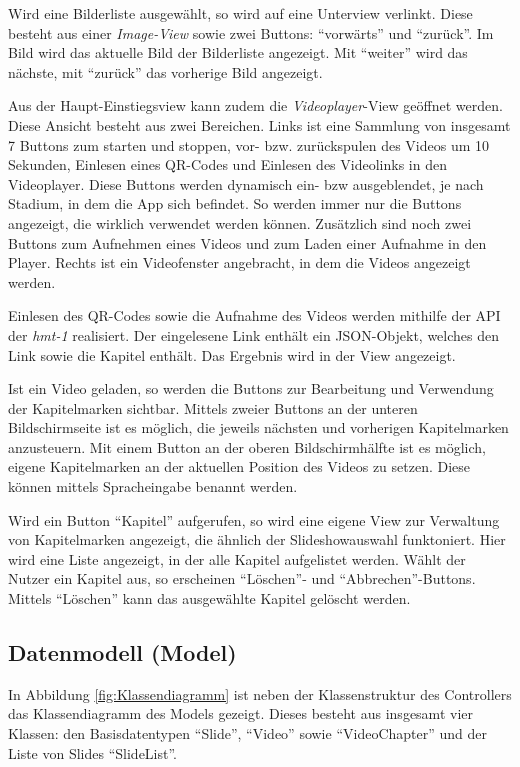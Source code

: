Wird eine Bilderliste ausgewählt, so wird auf eine Unterview verlinkt. Diese besteht aus einer \emph{Image-View} sowie zwei Buttons: \enquote{vorwärts} und \enquote{zurück}. Im Bild wird das aktuelle Bild der Bilderliste angezeigt. Mit \enquote{weiter} wird das nächste, mit \enquote{zurück} das vorherige Bild angezeigt.

Aus der Haupt-Einstiegsview kann zudem die \emph{Videoplayer}-View geöffnet werden. Diese Ansicht besteht aus zwei Bereichen. Links ist eine Sammlung von insgesamt 7 Buttons zum starten und stoppen, vor- bzw. zurückspulen des Videos um 10 Sekunden, Einlesen eines QR-Codes und Einlesen des Videolinks in den Videoplayer. Diese Buttons werden dynamisch ein- bzw ausgeblendet, je nach Stadium, in dem die App sich befindet. So werden immer nur die Buttons angezeigt, die wirklich verwendet werden können. Zusätzlich sind noch zwei Buttons zum Aufnehmen eines Videos und zum Laden einer Aufnahme in den Player. Rechts ist ein Videofenster angebracht, in dem die Videos angezeigt werden.

Einlesen des QR-Codes sowie die Aufnahme des Videos werden mithilfe der API der \emph{hmt-1} realisiert. Der eingelesene Link enthält ein JSON-Objekt, welches den Link sowie die Kapitel enthält. Das Ergebnis wird in der View angezeigt.

Ist ein Video geladen, so werden die Buttons zur Bearbeitung und Verwendung der Kapitelmarken sichtbar. Mittels zweier Buttons an der unteren Bildschirmseite ist es möglich, die jeweils nächsten und vorherigen Kapitelmarken anzusteuern. Mit einem Button an der oberen Bildschirmhälfte ist es möglich, eigene Kapitelmarken an der aktuellen Position des Videos zu setzen. Diese können mittels Spracheingabe benannt werden.

Wird ein Button \enquote{Kapitel} aufgerufen, so wird eine eigene View zur Verwaltung von Kapitelmarken angezeigt, die ähnlich der Slideshowauswahl funktoniert. Hier wird eine Liste angezeigt, in der alle Kapitel aufgelistet werden. Wählt der Nutzer ein Kapitel aus, so erscheinen \enquote{Löschen}- und \enquote{Abbrechen}-Buttons. Mittels \enquote{Löschen} kann das ausgewählte Kapitel gelöscht werden. 
%
%
\subsection{Datenmodell (Model)}
\label{sec:Datenmodell}
In Abbildung \ref{fig:Klassendiagramm} ist neben der Klassenstruktur des Controllers das Klassendiagramm des Models gezeigt. Dieses besteht aus insgesamt vier Klassen: den Basisdatentypen \enquote{Slide}, \enquote{Video} sowie \enquote{VideoChapter} und der Liste von Slides \enquote{SlideList}. 


